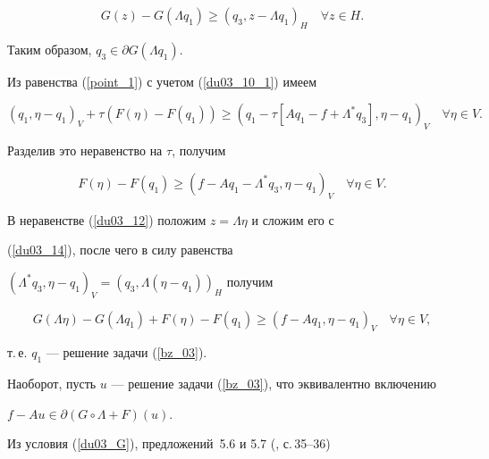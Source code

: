 \begin{pf}
\begin{equation}
G(z)-G(\Lambda q_1) \geq (q_3, z-\Lambda q_1)_H \quad \forall z \in H .


\label{du03_12}


\end{equation}


Таким образом, $q_3 \in \partial G(\Lambda q_1)$. 


Из равенства (\ref{point_1}) с учетом (\ref{du03_10_1}) имеем


\begin{equation}


 (q_1, \eta-q_1)_V+ \tau (F(\eta)-F(q_1))


\geq (q_1-\tau [ {A q_1- f+\Lambda ^*q_3} ] , \eta-q_1)_V 


 \quad \forall \eta \in V.


\label{du03_13}


\end{equation}


Разделив это неравенство на $\tau$, получим


\begin{equation}


F(\eta)-F(q_1) \geq 


 (f-A q_1- \Lambda ^*q_3 , \eta-q_1)_V 


 \quad \forall \eta \in V.


\label{du03_14}


\end{equation}


В неравенстве (\ref{du03_12}) положим $z=\Lambda \eta$ и сложим его с 


(\ref{du03_14}), после чего в силу равенства\linebreak


$(\Lambda ^*q_3 , \eta-q_1)_V=(q_3, \Lambda (\eta-q_1))_H $ получим


$$


G(\Lambda \eta)-G(\Lambda q_1) +F(\eta)-F(q_1)


\geq (f-A q_1, \eta-q_1)_V 


\quad \forall \eta \in V,


$$


т.\,е. $q_1$ --- решение задачи (\ref{bz_03}).





\noindent{}Наоборот, пусть $u$ --- решение задачи (\ref{bz_03}), что эквивалентно включению


$f-Au \in \partial (G \circ \Lambda +F)(u)$.


Из условия (\ref{du03_G}), предложений~5.6 и 5.7 (\cite{ET_79}, с.\,35--36) 



\end{pf}
